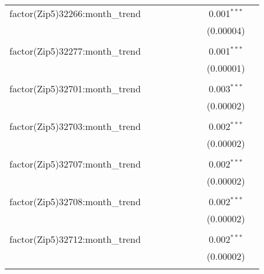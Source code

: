 \begin{table}[H]
{\begin{tabular}{@{\extracolsep{5pt}}lcccccccc}
  factor(Zip5)32266:month\_trend &  &  &  &  &  &  & 0.001$^{***}$ &  \\  

   &  &  &  &  &  &  & (0.00004) &  \\  

   & & & & & & & & \\  

  factor(Zip5)32277:month\_trend &  &  &  &  &  &  & 0.001$^{***}$ &  \\  

   &  &  &  &  &  &  & (0.00001) &  \\  

   & & & & & & & & \\  

  factor(Zip5)32701:month\_trend &  &  &  &  &  &  & 0.003$^{***}$ &  \\  

   &  &  &  &  &  &  & (0.00002) &  \\  

   & & & & & & & & \\  

  factor(Zip5)32703:month\_trend &  &  &  &  &  &  & 0.002$^{***}$ &  \\  

   &  &  &  &  &  &  & (0.00002) &  \\  

   & & & & & & & & \\  

  factor(Zip5)32707:month\_trend &  &  &  &  &  &  & 0.002$^{***}$ &  \\  

   &  &  &  &  &  &  & (0.00002) &  \\  

   & & & & & & & & \\  

  factor(Zip5)32708:month\_trend &  &  &  &  &  &  & 0.002$^{***}$ &  \\  

   &  &  &  &  &  &  & (0.00002) &  \\  

   & & & & & & & & \\  

  factor(Zip5)32712:month\_trend &  &  &  &  &  &  & 0.002$^{***}$ &  \\  

   &  &  &  &  &  &  & (0.00002) &  \\  

   & & & & & & & & \\  


\end{tabular}}
\end{table}

